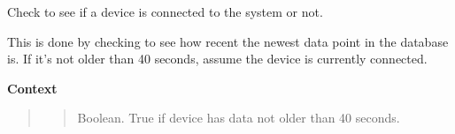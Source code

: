 \documentclass[letterpaper,10pt,english]{sphinxmanual}
\begin{document}

\begin{fulllineitems}
\label{modules/webapp:webapp.views.device_status}
Check to see if a device is connected to the system or not.

This is done by checking to see how recent the newest data point in
the database is. If it's not older than 40 seconds, assume the device
is currently connected.

\textbf{Context}
\begin{quote}

\begin{quote}

Boolean. True if device has data not older than 40 seconds.
\end{quote}
\end{quote}

\end{fulllineitems}


\begin{fulllineitems}
\label{modules/webapp:webapp.views.export_data}
\end{fulllineitems}

\end{document}
